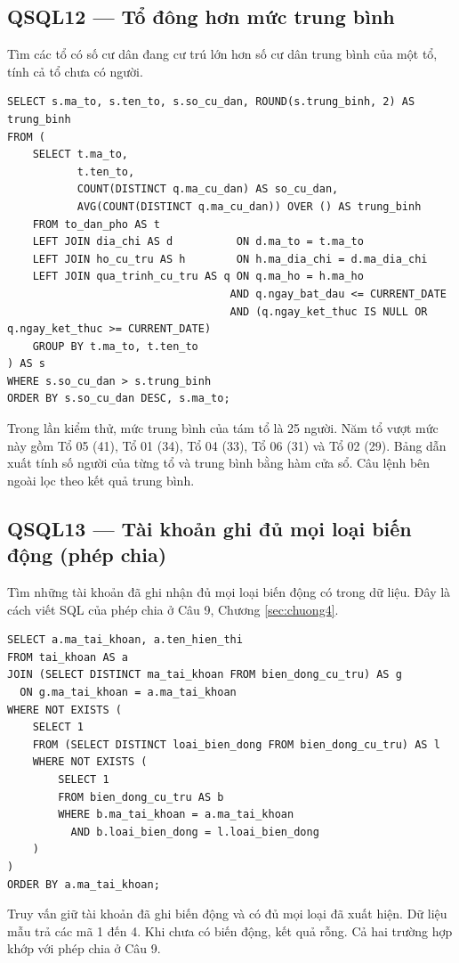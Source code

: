 \noindent\begin{minipage}{\linewidth}
\subsection*{QSQL12 --- Tổ đông hơn mức trung bình}

Tìm các tổ có số cư dân đang cư trú lớn hơn số cư dân trung bình của một tổ, tính cả tổ chưa có người.

\begin{lstlisting}[style=sqlvn, basicstyle=\ttfamily\fontsize{10pt}{10.5pt}\selectfont]
SELECT s.ma_to, s.ten_to, s.so_cu_dan, ROUND(s.trung_binh, 2) AS trung_binh
FROM (
    SELECT t.ma_to,
           t.ten_to,
           COUNT(DISTINCT q.ma_cu_dan) AS so_cu_dan,
           AVG(COUNT(DISTINCT q.ma_cu_dan)) OVER () AS trung_binh
    FROM to_dan_pho AS t
    LEFT JOIN dia_chi AS d          ON d.ma_to = t.ma_to
    LEFT JOIN ho_cu_tru AS h        ON h.ma_dia_chi = d.ma_dia_chi
    LEFT JOIN qua_trinh_cu_tru AS q ON q.ma_ho = h.ma_ho
                                   AND q.ngay_bat_dau <= CURRENT_DATE
                                   AND (q.ngay_ket_thuc IS NULL OR q.ngay_ket_thuc >= CURRENT_DATE)
    GROUP BY t.ma_to, t.ten_to
) AS s
WHERE s.so_cu_dan > s.trung_binh
ORDER BY s.so_cu_dan DESC, s.ma_to;
\end{lstlisting}

Trong lần kiểm thử, mức trung bình của tám tổ là 25 người. Năm tổ vượt mức này gồm Tổ 05 (41), Tổ 01 (34), Tổ 04 (33), Tổ 06 (31) và Tổ 02 (29). Bảng dẫn xuất tính số người của từng tổ và trung bình bằng hàm cửa sổ. Câu lệnh bên ngoài lọc theo kết quả trung bình.
\end{minipage}\par\medskip

\noindent\begin{minipage}{\linewidth}
\subsection*{QSQL13 --- Tài khoản ghi đủ mọi loại biến động (phép chia)}
\label{sec:qsql13-phuluc}

Tìm những tài khoản đã ghi nhận đủ mọi loại biến động có trong dữ liệu. Đây là cách viết SQL của phép chia ở Câu 9, Chương \ref{sec:chuong4}.

\begin{lstlisting}[style=sqlvn, basicstyle=\ttfamily\fontsize{10pt}{10.5pt}\selectfont]
SELECT a.ma_tai_khoan, a.ten_hien_thi
FROM tai_khoan AS a
JOIN (SELECT DISTINCT ma_tai_khoan FROM bien_dong_cu_tru) AS g
  ON g.ma_tai_khoan = a.ma_tai_khoan
WHERE NOT EXISTS (
    SELECT 1
    FROM (SELECT DISTINCT loai_bien_dong FROM bien_dong_cu_tru) AS l
    WHERE NOT EXISTS (
        SELECT 1
        FROM bien_dong_cu_tru AS b
        WHERE b.ma_tai_khoan = a.ma_tai_khoan
          AND b.loai_bien_dong = l.loai_bien_dong
    )
)
ORDER BY a.ma_tai_khoan;
\end{lstlisting}

Truy vấn giữ tài khoản đã ghi biến động và có đủ mọi loại đã xuất hiện. Dữ liệu mẫu trả các mã 1 đến 4. Khi chưa có biến động, kết quả rỗng. Cả hai trường hợp khớp với phép chia ở Câu 9.
\end{minipage}\par\medskip
